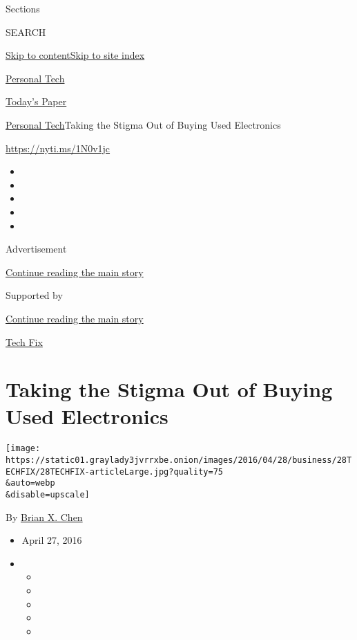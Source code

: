 Sections

SEARCH

\protect\hyperlink{site-content}{Skip to
content}\protect\hyperlink{site-index}{Skip to site index}

\href{https://www.nytimes3xbfgragh.onion/section/technology/personaltech}{Personal
Tech}

\href{https://myaccount.nytimes3xbfgragh.onion/auth/login?response_type=cookie\&client_id=vi}{}

\href{https://www.nytimes3xbfgragh.onion/section/todayspaper}{Today's
Paper}

\href{/section/technology/personaltech}{Personal Tech}\textbar{}Taking
the Stigma Out of Buying Used Electronics

\url{https://nyti.ms/1N0v1jc}

\begin{itemize}
\item
\item
\item
\item
\item
\end{itemize}

Advertisement

\protect\hyperlink{after-top}{Continue reading the main story}

Supported by

\protect\hyperlink{after-sponsor}{Continue reading the main story}

\href{/column/tech-fix}{Tech Fix}

\hypertarget{taking-the-stigma-out-of-buying-used-electronics}{%
\section{Taking the Stigma Out of Buying Used
Electronics}\label{taking-the-stigma-out-of-buying-used-electronics}}

\texttt{[image: https://static01.graylady3jvrrxbe.onion/images/2016/04/28/business/28TECHFIX/28TECHFIX-articleLarge.jpg?quality=75\\\&auto=webp\\\&disable=upscale]}

By \href{http://www.nytimes3xbfgragh.onion/by/brian-x-chen}{Brian X.
Chen}

\begin{itemize}
\item
  April 27, 2016
\item
  \begin{itemize}
  \item
  \item
  \item
  \item
  \item
  \end{itemize}
\end{itemize}

